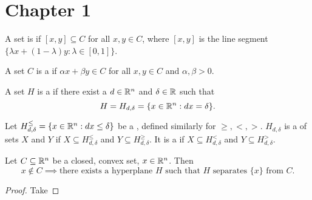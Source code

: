 \documentclass{exam}
\begin{document}
    \section{Chapter 1}\label{sec:chapter1}
    
    \begin{define}
        A set is  if $[x,y] \subseteq C$ for all $x,y \in C$, where $[x,y]$ is the line segment $\{ \lambda x + (1-\lambda)y : \lambda \in [0,1] \}$.
    \end{define}
    \begin{define}
        A set $C$ is a  if $\alpha x + \beta y \in C$ for all $x,y \in C$ and $\alpha, \beta >0$.
    \end{define}
    \begin{define}
        A set $H$ is a  if there exist a $d \in \mathbb{R}^n$ and $\delta \in \mathbb{R}$ such that
        \[
            H = H_{d, \delta} = \{ x \in \mathbb{R}^n : d x = \delta \}.
        \]
    \end{define}
    \begin{define}
        Let $H_{d,\delta}^{\le} = \{ x \in \mathbb{R}^n : dx \le \delta \}$ be a , defined similarly for $\ge, <, >$.
        $H_{d, \delta}$ is a  of sets $X$ and $Y$ if $X \subseteq H_{d,\delta}^\le$ and $Y \subseteq H_{d,\delta}^\ge$.
        It is a  if $X \subseteq H_{d,\delta}^<$ and $Y \subseteq H_{d,\delta}^>$.
    \end{define}
    \begin{theorem}
        Let $C \subseteq \mathbb{R}^n$ be a closed, convex set, $x \in \mathbb{R}^n$.
        Then
        \[
            x \not \in C \implies \text{there exists a hyperplane $H$ such that $H$ separates $\{x\}$ from $C$}.
        \]
    \end{theorem}
    \begin{proof}
        Take
    \end{proof}
\end{document}
